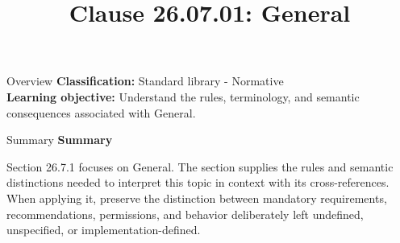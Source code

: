 \documentclass[10pt,letterpaper]{article}
\title{Clause 26.07.01: General}
\author{}
\date{}
\begin{document}
\maketitle
\begin{CornellOverviewBox}{Overview}
\textbf{Classification:} Standard library - Normative\\[2pt]
\textbf{Learning objective:} Understand the rules, terminology, and semantic consequences associated with General.
\end{CornellOverviewBox}\begin{CornellSummaryBox}{Summary}
{\sffamily\bfseries\color{Accent} Summary}\par\vspace{3pt}Section 26.7.1 focuses on General. The section supplies the rules and semantic distinctions needed to interpret this topic in context with its cross-references. When applying it, preserve the distinction between mandatory requirements, recommendations, permissions, and behavior deliberately left undefined, unspecified, or implementation-defined.
\end{CornellSummaryBox}
\end{document}
